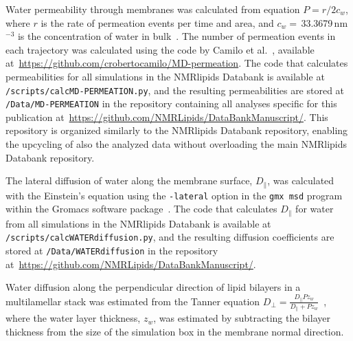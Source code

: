 \documentclass[fleqn,10pt]{wlscirep}
\begin{document}
Water permeability through membranes was calculated from equation $P=r/2c_w$, where $r$ is the rate of permeation events per time and area, and $c_w=$\,33.3679\,nm$^{-3}$ is the concentration of water in bulk~\cite{venable19}. The number of permeation events in each trajectory was calculated using the code by Camilo et al.~\cite{camilo2022}, available at~\url{https://github.com/crobertocamilo/MD-permeation}. The code that calculates permeabilities for all simulations in the NMRlipids Databank is available at \texttt{/scripts/calcMD-PERMEATION.py}, and the resulting permeabilities are stored at \texttt{/Data/MD-PERMEATION} in the repository containing all analyses specific for this publication at~\url{https://github.com/NMRLipids/DataBankManuscript/}. This repository is organized similarly to the NMRlipids Databank repository, enabling the upcycling of also the analyzed data without overloading the main NMRlipids Databank repository. 

The lateral diffusion of water along the membrane surface, $D_\parallel$, was calculated with the Einstein's equation using the \texttt{-lateral} option in the \texttt{gmx\,msd} program within the Gromacs software package~\cite{gromacsMANUAL}. The code that calculates $D_\parallel$ for water from all simulations in the NMRlipids Databank is available at \texttt{/scripts/calcWATERdiffusion.py}, and the resulting diffusion coefficients are stored at \texttt{/Data/WATERdiffusion} in the repository at~\url{https://github.com/NMRLipids/DataBankManuscript/}.

Water diffusion along the perpendicular direction of lipid bilayers in a multilamellar stack was estimated from the Tanner equation $D_\mathrm{\perp} = \frac{D_\parallel P z_w}{D_\parallel + P z_w}$~\cite{tanner78,wasterby02}, where the water layer thickness, $z_w$, was estimated by subtracting the bilayer thickness from the size of the simulation box in the membrane normal direction.


\end{document}
